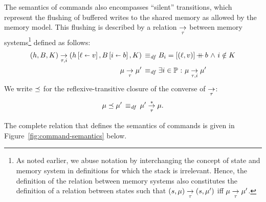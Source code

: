 \documentclass[11pt]{report}         %
\begin{document}
The semantics of commands also encompasses ``silent'' transitions, which represent the flushing of buffered writes to the shared memory as allowed by the memory model. This flushing is described by a relation $\underset{\tau}{\rightarrow}$ between memory systems\footnote{As noted earlier, we abuse notation by interchanging the concept of state and memory system in definitions for which the stack is irrelevant. Hence, the definition of the relation between memory systems  also constitutes the definition of a relation between states such that $(s,\mu) \underset{\tau}{\rightarrow} (s,\mu')$ iff $\mu \underset{\tau}{\rightarrow} \mu'$.} defined as follows: \begin{align*} (h,B,K) \underset{\tau,i}{\rightarrow} (h \left[ \ell \shortleftarrow v \right],B \left[ i \shortleftarrow b \right],K) \operatorname{\;\equiv_{\mathit{df}}\;} & B_i = \left[(\ell,v)\right] \operatorname{+\!\!\!+} b \operatorname{\,\wedge\,} i \notin K \\ 
\mu \underset{\tau}{\rightarrow} \mu' \operatorname{\;\equiv_{\mathit{df}}\;} & \exists i \in  \mathbb{P} \operatorname{\,:\,} \mu \underset{\tau,i}{\rightarrow} \mu'
\end{align*} We write $\preceq$ for the reflexive-transitive closure of the converse of $\underset{\tau}{\rightarrow}$: \[ \mu \preceq \mu' \operatorname{\;\equiv_{\mathit{df}}\;} \mu' \overset{\ast}{\underset{\tau}{\rightarrow}} \mu.\]

The complete relation that defines the semantics of commands is given in Figure~\ref{fig:command-semantics} below. 
\end{document}
